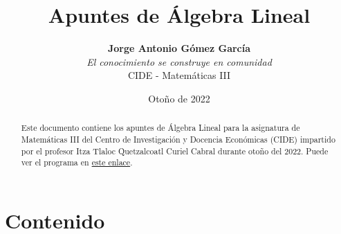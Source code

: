 \documentclass[8pt]{article}
\title{\textbf{Apuntes de Álgebra Lineal}}
\author{\textbf{Jorge Antonio Gómez García} \\ \textit{El conocimiento se construye en comunidad} \\ CIDE - Matemáticas III}
\date{Otoño de 2022}
\begin{document}
\maketitle

\begin{abstract}
    Este documento contiene los apuntes de Álgebra Lineal para la asignatura de Matemáticas III del Centro de Investigación y Docencia Económicas (CIDE) impartido por el profesor Itza Tlaloc Quetzalcoatl Curiel Cabral durante otoño del 2022. Puede ver el programa en \href{https://cideo365-my.sharepoint.com/:w:/g/personal/antonio_gomez_alumnos_cide_edu/EQY9B-QCIeBJpjJtvONTktkBMRqEuZp0hfoJHeW0zbszkw?e=SFeY7r}{este enlace}.
\end{abstract}

\tableofcontents


\section*{Contenido}
\end{document}
